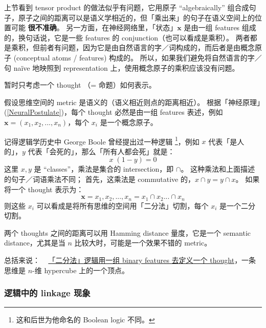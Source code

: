 \documentclass[orivec]{llncs}
\newcommand{\vect}[1]{\boldsymbol{#1}}
\begin{document}
上节看到 tensor product 的做法似乎有问题，它用原子 ``algebraically'' 组合成句子，原子之间的距离可以是语义学相近的，但「乘出来」的句子在语义空间上的位置可能 \textbf{很不准确}。 另一方面，在神经网络里，「状态」$\vect{x}$ 是由一组 features 组成的，换句话说，它是一些 features 的 conjunction（也可以看成是乘积）。 两者都是乘积，但前者有问题，因为它是由自然语言的字／词构成的，而后者是由概念原子 (conceptual atoms / features) 构成的。  所以，如果我们避免将自然语言的字／句 na\"{i}ve 地映照到 representation 上，使用概念原子的乘积应该没有问题。

暂时只考虑一个 thought （= 命题）如何表示。

假设思维空间的 metric 是语义的（语义相近则点的距离相近）。 根据「神经原理」(\ref{NeuralPostulate})，每个 thought 必然是由一组 features 表述，例如 $\vect{x} = (x_1, x_2, ..., x_n)$，每个 $x_i$ 是一个概念原子。 %

记得逻辑学历史中 George Boole 曾经提出过一种逻辑 \footnote{这和后世为他命名的 Boolean logic 不同。}，例如 $x$ 代表「是人的」，$y$ 代表「会死的」，那么「所有人都会死」就是：
\begin{equation}
x \; (1 - y) = 0
\end{equation}
这里 $x, y$ 是 ``classes''，乘法是集合的 intersection，即 $\cap$。 这种乘法和上面描述的句子／词语乘法不同； 首先，这乘法是 commutative 的，$x \cap y = y \cap x$。 如果将一个 thought 表示为：
\begin{equation}
\vect{x} = {x_1, x_2, ..., x_n} = x_1 \cap x_2 ... \cap x_n
\end{equation}
则这些 $x_i$ 可以看成是将所有思维的空间用「二分法」切割，每个 $x_i$ 是一个二分切割。 

两个 thoughts 之间的距离可以用 Hamming distance 量度，它是一个 semantic distance，尤其是当 $n$ 比较大时，可能是一个效果不错的 metric。 

总括来说： ~ \underline{「二分法」逻辑用一组 binary features 去定义一个 thought}，一条思维是 $n$-维 hypercube 上的一个顶点。


\subsubsection{逻辑中的 linkage 现象}
\end{document}
